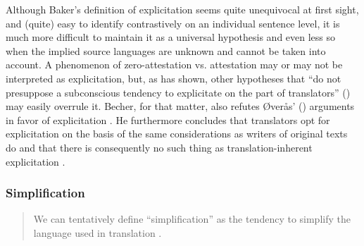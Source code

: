 Although Baker’s definition of explicitation seems quite unequivocal at first sight, and (quite) easy to identify contrastively on an individual sentence level, it is much more difficult to maintain it as a universal hypothesis and even less so when the implied source languages are unknown and cannot be taken into account. A phenomenon of zero-attestation vs. attestation may or may not be interpreted as explicitation, but, as \citet{becher_abandoning_2010} has shown, other hypotheses that “do not presuppose a subconscious tendency to explicitate on the part of translators” (\citeyear[11]{becher_abandoning_2010}) may easily overrule it. Becher, for that matter, also refutes Øverås’ (\citeyear{overas_search_1998}) arguments in favor of explicitation \citep[12--16]{becher_abandoning_2010}. He furthermore concludes that translators opt for explicitation on the basis of the same considerations as writers of original texts do and that there is consequently no such thing as translation-inherent explicitation \citep[22--23]{becher_abandoning_2010}.

\subsubsection{Simplification}
\label{sec:2.2.2.2}  
\begin{quote}
We can tentatively define “simplification” as the tendency to simplify the language used in translation \citep[181]{baker_corpus-based_1996}.
\end{quote}

